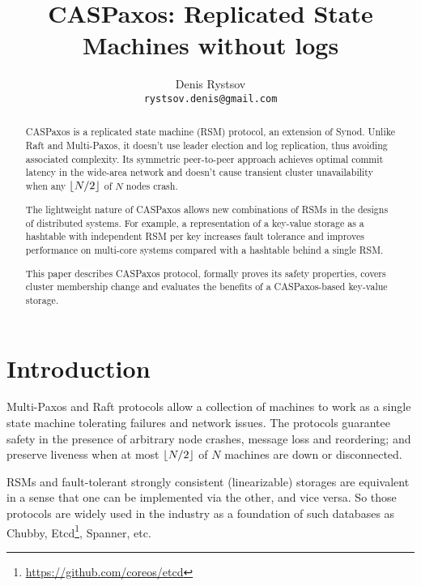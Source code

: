 \documentclass[12pt]{article}
\theoremstyle{definition}
\DeclarePairedDelimiter{\floor}{\lfloor}{\rfloor}
\begin{document}
\title{CASPaxos: Replicated State Machines without logs}

\author{Denis Rystsov\\\texttt{rystsov.denis@gmail.com}}

\maketitle

\begin{abstract}
CASPaxos is a replicated state machine (RSM) protocol, an extension of Synod. Unlike Raft and Multi-Paxos, it doesn't use leader election and log replication, thus avoiding associated complexity. Its symmetric peer-to-peer approach achieves optimal commit latency in the wide-area network and doesn't cause transient cluster unavailability when any $\floor{N/2}$ of $N$ nodes crash.

The lightweight nature of CASPaxos allows new combinations of RSMs in the designs of distributed systems. For example, a representation of a key-value storage as a hashtable with independent RSM per key increases fault tolerance and improves performance on multi-core systems compared with a hashtable behind a single RSM.

This paper describes CASPaxos protocol, formally proves its safety properties, covers cluster membership change and evaluates the benefits of a CASPaxos-based key-value storage.
\end{abstract}

\section{Introduction}

Multi-Paxos\cite{lamport01} and Raft\cite{raft} protocols allow a collection of machines to work as a single state machine tolerating failures and network issues. The protocols guarantee safety in the presence of arbitrary node crashes, message loss and reordering; and preserve liveness when at most $\floor{N/2}$ of $N$ machines are down or disconnected.

RSMs and fault-tolerant strongly consistent (linearizable) storages are equivalent in a sense that one can be implemented via the other, and vice versa. So those protocols are widely used in the industry as a foundation of such databases as Chubby\cite{chubby}, Etcd\footnote{\href{https://github.com/coreos/etcd}{https://github.com/coreos/etcd}}, Spanner\cite{spanner}, etc.
\end{document}
